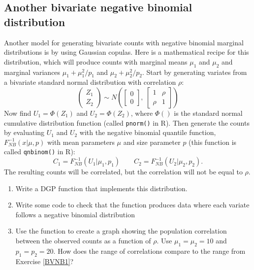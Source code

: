 \documentclass[
]{book}
\begin{document}
\subsection{Another bivariate negative binomial distribution}\label{BVNB2}

Another model for generating bivariate counts with negative binomial marginal distributions is by using Gaussian copulas. Here is a mathematical recipe for this distribution, which will produce counts with marginal means \(\mu_1\) and \(\mu_2\) and marginal variances \(\mu_1 + \mu_1^2 / p_1\) and \(\mu_2 + \mu_2^2 / p_2\). Start by generating variates from a bivariate standard normal distribution with correlation \(\rho\):
\[
\left(\begin{array}{c}Z_1 \\ Z_2 \end{array}\right) \sim N\left(\left[\begin{array}{c}0 \\ 0\end{array}\right], \ \left[\begin{array}{cc}1  & \rho \\ \rho & 1\end{array}\right]\right)
\]
Now find \(U_1 = \Phi(Z_1)\) and \(U_2 = \Phi(Z_2)\), where \(\Phi()\) is the standard normal cumulative distribution function (called \texttt{pnorm()} in R).
Then generate the counts by evaluating \(U_1\) and \(U_2\) with the negative binomial quantile function, \(F_{NB}^{-1}(x | \mu, p)\) with mean parameters \(\mu\) and size parameter \(p\) (this function is called \texttt{qnbinom()} in R):
\[
C_1 = F_{NB}^{-1}(U_1 | \mu_1, p_1) \qquad C_2 = F_{NB}^{-1}(U_2 |  \mu_2, p_2).
\]
The resulting counts will be correlated, but the correlation will not be equal to \(\rho\).

\begin{enumerate}
\def\labelenumi{\arabic{enumi}.}
\item
  Write a DGP function that implements this distribution.
\item
  Write some code to check that the function produces data where each variate follows a negative binomial distribution
\item
  Use the function to create a graph showing the population correlation between the observed counts as a function of \(\rho\). Use \(\mu_1 = \mu_2 = 10\) and \(p_1 = p_2 = 20\). How does the range of correlations compare to the range from Exercise \ref{BVNB1}?
\end{enumerate}
\end{document}

